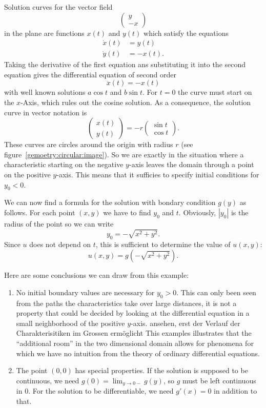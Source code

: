 Solution curves for the vector field
\[
\begin{pmatrix}
y\\-x
\end{pmatrix}
\]
in the plane are functions $x(t)$ and $y(t)$ which satisfy the equations
\begin{align*}
\dot x(t)&=y(t)\\
\dot y(t)&=-x(t).
\end{align*}
Taking the derivative of the first equation ans substituting it into
the second equation gives the differential equation of second order
\[
\ddot x(t)=-x(t)
\]
with well known solutions $a\cos t$ and $b \sin t$.
For $t=0$ the curve must start on the $x$-Axis, which rules out the
cosine solution.
As a consequence, the solution curve in vector notation is
\[
\begin{pmatrix}
x(t)\\y(t)
\end{pmatrix}
=-r\begin{pmatrix}
\sin t\\
\cos t
\end{pmatrix}.
\]
These curves are circles around the origin with radius $r$
(see figure~\ref{gemoetry:circular:image}).
So we are exactly in the situation where a characteristic starting on
the negative $y$-axis leaves the domain through a point on the positive
$y$-axis.
This means that it sufficies to specify initial conditions for $y_0<0$.

We can now find a formula for the solution with bondary condition $g(y)$
as follows.
For each point $(x,y)$ we have to find $y_0$ and $t$.
Obviously, $|y_0|$ is the radius of the point so we can write
\[
y_0 = -\sqrt{x^2+y^2}.
\]
Since $u$ does not depend on $t$, this is sufficient to determine
the value of $u(x,y)$:
\[
u(x,y)=g(-\sqrt{x^2+y^2}).
\]

Here are some conclusions we can draw from this example:
\begin{enumerate}
\item
No initial boundary values are necessary for $y_0>0$.
This can only been seen from the paths the characteristics take over large
distances, it is not a property that could be decided by looking at the
differential equation in a small neighborhood of the positive $y$-axis.
ansehen, erst der Verlauf der Charakterisitiken im Grossen ermöglicht
This examples illustrates that the ``additional room'' in the two dimensional
domain allows for phenomena for which we have no intuition from the
theory of ordinary differential equations.
\item
The point $(0,0)$ has special properties.
If the solution is supposed to be continuous, we need
$g(0)=\lim_{y\to 0-} g(y)$, so $g$ must be left continuous in $0$.
For the solution to be differentiable, we need $g'(x)=0$ in addition
to that.
\end{enumerate}

